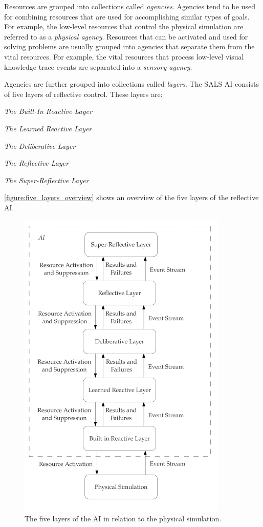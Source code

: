 Resources are grouped into collections called {\emph{agencies}}.
Agencies tend to be used for combining resources that are used for
accomplishing similar types of goals.  For example, the low-level
resources that control the physical simulation are referred to as a
{\emph{physical agency}}.  Resources that can be activated and used
for solving problems are usually grouped into agencies that separate
them from the vital resources.  For example, the vital resources that
process low-level visual knowledge trace events are separated into a
{\emph{sensory agency}}.

Agencies are further grouped into collections called {\emph{layers}}.
The SALS AI consists of five layers of reflective control.  These
layers are:
\begin{samepage}
  \begin{packed_enumerate}
  \item{{\emph{The Built-In Reactive Layer}}}
  \item{{\emph{The Learned Reactive Layer}}}
  \item{{\emph{The Deliberative Layer}}}
  \item{{\emph{The Reflective Layer}}}
  \item{{\emph{The Super-Reflective Layer}}}
  \end{packed_enumerate}
\end{samepage}
{\mbox{\autoref{figure:five_layers_overview}}} shows an overview of
the five layers of the reflective AI.
\begin{figure}
\centering
\includegraphics[width=10cm]{gfx/five_layers_overview}
\caption[The five layers of the AI in relation to the physical
  simulation.]{The five layers of the AI in relation to the physical
  simulation.}
\label{figure:five_layers_overview}
\end{figure}
